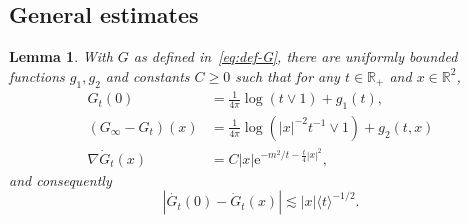 \documentclass[11pt, a4paper]{scrartcl}
\numberwithin{equation}{section}
\theoremstyle{plain}
\newtheorem{lemma}[foo]{Lemma}
\theoremstyle{remark}
\newcommand{\mathe}{\mathrm{e}}
\begin{document}
\subsection{General estimates}

\begin{lemma}
	\label{lem:hk-basic-bounds}With $G$ as defined in~\eqref{eq:def-G}, there
	are uniformly bounded functions $g_1, g_2$ and constants $C \geqslant 0$
	such that for any $t \in \mathbb{R}_+$ and $x \in \mathbb{R}^2$,
	\begin{align}
		G_t (0)                & = \frac{1}{4 \pi} \log (t \vee 1) + g_1 (t),
		\label{eq:cov-0-bound}                                                 \\
		(G_{\infty} - G_t) (x) & = \frac{1}{4 \pi} \log (| x |^{- 2} t^{- 1}
		\vee 1) + g_2 (t, x) \label{eq:cov-x-s-bound}                          \\
		\nabla \dot{G}_t  (x)  & = C | x | \mathe^{- m^2 / t - \frac{t}{4} | x
			|^2} \label{eq:grad-g},
	\end{align}
	and consequently
	\begin{equation}
		| \dot{G_t} (0) - \dot{G}_t (x) | \lesssim | x |  \langle t \rangle^{- 1 /
			2} \label{eq:hk-g0-gx} .
	\end{equation}
\end{lemma}
\end{document}
